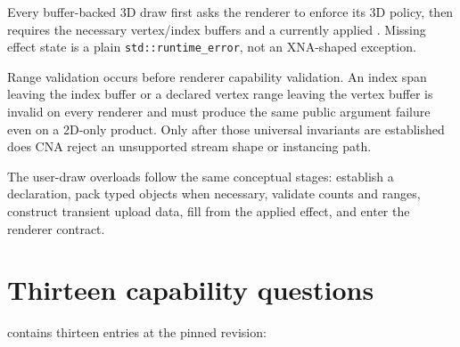Every buffer-backed 3D draw first asks the renderer to enforce its 3D policy, then requires the
necessary vertex/index buffers and a currently applied .  Missing effect state is a
plain \texttt{std::runtime\_error}, not an XNA-shaped exception.

Range validation occurs before renderer capability validation.  An index span leaving the index
buffer or a declared vertex range leaving the vertex buffer is invalid on every renderer and must
produce the same public argument failure even on a 2D-only product.  Only after those universal
invariants are established does CNA reject an unsupported stream shape or instancing path.

The user-draw overloads follow the same conceptual stages: establish a declaration, pack typed
objects when necessary, validate counts and ranges, construct transient upload data, fill
 from the applied effect, and enter the renderer contract.

\section{Thirteen capability questions}

 contains thirteen entries at the pinned revision:

